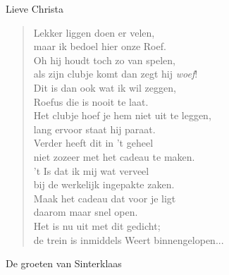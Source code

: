 \documentclass[12pt]{brief}
\begin{document}
\begin{letter}{Lieve Christa}
\begin{verse}
Lekker liggen doen er velen,\\
maar ik bedoel hier onze Roef.\\
Oh hij houdt toch zo van spelen,\\
als zijn clubje komt dan zegt hij \emph{woef}!\\[1.5em]

Dit is dan ook wat ik wil zeggen,\\
Roefus die is nooit te laat.\\
Het clubje hoef je hem niet uit te leggen,\\
lang ervoor staat hij paraat.\\[1.5em]

Verder heeft dit in 't geheel\\
niet zozeer met het cadeau te maken.\\
't Is dat ik mij wat verveel\\
bij de werkelijk ingepakte zaken.\\[1.5em]

Maak het cadeau dat voor je ligt\\
daarom maar snel open.\\
Het is nu uit met dit gedicht;\\
de trein is inmiddels Weert binnengelopen...\\[1.5em]

\end{verse}


De groeten van Sinterklaas


\closing{}

\end{letter}
\end{document}
